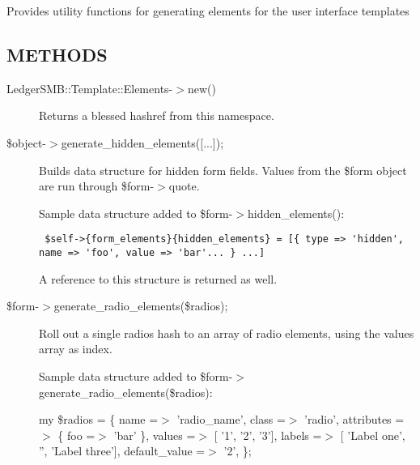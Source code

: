 \begin{description}
\begin{description}
\begin{description}
\begin{description}
\begin{description}
\begin{description}
\begin{description}
\begin{description}
\begin{description}
\begin{description}
Provides utility functions for generating elements for the user interface
templates

\subsection*{METHODS\label{LedgerSMB::Template::Elements_METHODS}}
\begin{description}

\item[{LedgerSMB::Template::Elements-$>$new()}] \mbox{}

Returns a blessed hashref from this namespace.

\end{description}
\begin{description}

\item[{\$object-$>$generate\_hidden\_elements([...]);}] \mbox{}

Builds data structure for hidden form fields.  Values from the
\$form object are run through \$form-$>$quote.



Sample data structure added to \$form-$>$hidden\_elements():

\begin{verbatim}
 $self->{form_elements}{hidden_elements} = [{ type => 'hidden', name => 'foo', value => 'bar'... } ...]
\end{verbatim}


A reference to this structure is returned as well.

\end{description}
\begin{description}

\item[{\$form-$>$generate\_radio\_elements(\$radios);}] \mbox{}

Roll out a single radios hash to an array of radio elements,
using the values array as index.



Sample data structure added to \$form-$>$generate\_radio\_elements(\$radios):



my \$radios = \{
    name =$>$ 'radio\_name',
    class =$>$ 'radio',
    attributes =$>$ \{ foo =$>$ 'bar' \},
    values =$>$ [ '1', '2', '3'],
    labels =$>$ [ 'Label one', '', 'Label three'],
    default\_value =$>$ '2',
\};

\end{description}
\begin{description}


\end{description}
\end{description}
\end{description}
\end{description}
\end{description}
\end{description}
\end{description}
\end{description}
\end{description}
\end{description}
\end{description}
